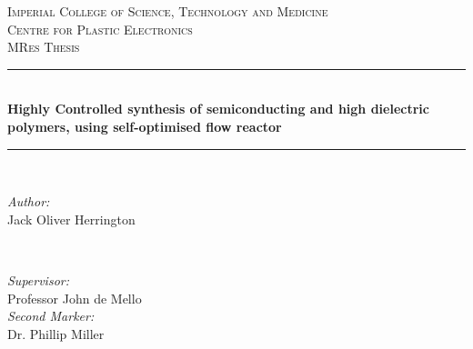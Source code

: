\begin{titlepage}
	\newcommand{\HRule}{\rule{\linewidth}{0.5mm}} %
	\setlength{\topmargin}{0in}
	\center %
	
	
	
	\textsc{\LARGE Imperial College of Science, Technology and Medicine}\\[0.5cm] %
	\textsc{\Large Centre for Plastic Electronics}\\[1.5cm] %
	\textsc{\Large MRes Thesis}\\[0.5cm] %
	
	
	\HRule \\[0.4cm]
	{ \huge \bfseries Highly Controlled synthesis of semiconducting and high dielectric polymers, using self-optimised flow reactor}\\[0.2cm] %
	\HRule \\[1cm]
	
	
	\begin{minipage}{0.4\textwidth}
		\begin{flushleft} \large
			\emph{Author:}\\
			Jack Oliver Herrington\\[0.5cm]
		\end{flushleft}
	\end{minipage}
	~
	\begin{minipage}{0.5\textwidth}
		\begin{flushright} \large
			\emph{Supervisor:} \\
			Professor John de Mello \\[0.5cm] %
			\emph{Second Marker:} \\
			Dr. Phillip Miller\\
		\end{flushright}
	\end{minipage}\\[2.5cm]
	

\end{titlepage}
